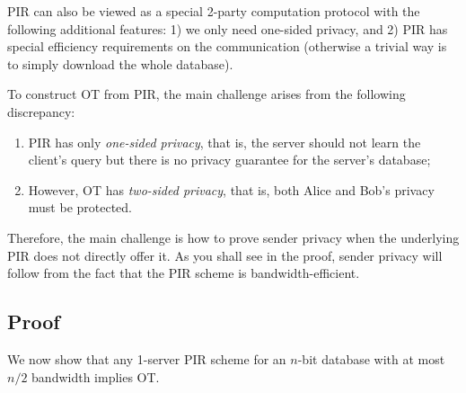 \begin{remark}
PIR can also be viewed as a special 2-party computation
protocol with the following additional features:  
1) we only need one-sided privacy, 
and 2) PIR has special efficiency requirements on the communication 
(otherwise a trivial way is to simply download the whole database).

To construct OT from PIR, the main challenge arises from the following discrepancy: 
    \begin{enumerate}
        \item PIR has only {\it one-sided privacy}, that is, the server
should not learn the client's query but there is no privacy guarantee
for the server's database; 
\item However, OT has {\it two-sided privacy}, that is, 
both Alice and Bob's privacy must be protected.
   \end{enumerate}
Therefore, the main challenge is how to prove sender privacy when the underlying PIR
does not directly offer it.
As you shall see in the proof, sender privacy will
follow
from the fact that the PIR scheme is bandwidth-efficient.
\end{remark}


\subsection{Proof}

We now show that any 1-server PIR scheme for an $n$-bit database
with at most $n/2$ bandwidth implies OT.


